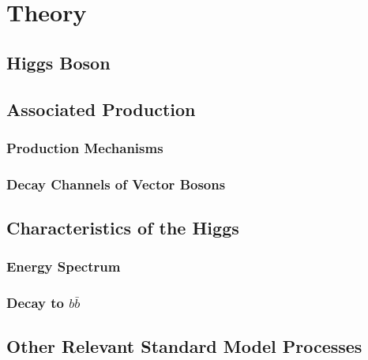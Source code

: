 \chapter{Theory}

\section{Higgs Boson}


\section{Associated Production}

\subsection{Production Mechanisms}

\subsection{Decay Channels of Vector Bosons}

\section{Characteristics of the Higgs}

\subsection{Energy Spectrum}

\subsection{Decay to $b\bar{b}$}

\section{Other Relevant Standard Model Processes}
